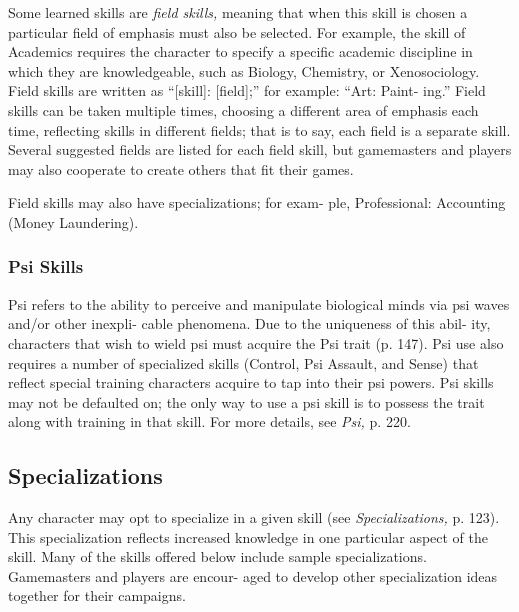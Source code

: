 Some learned skills are \textit{field skills,} meaning that when 
this skill is chosen a particular field of emphasis must 
also be selected. For example, the skill of Academics 
requires the character to specify a specific academic 
discipline in which they are knowledgeable, such as 
Biology, Chemistry, or Xenosociology. Field skills are 
written as ``[skill]: [field];'' for example: ``Art: Paint-
ing.'' Field skills can be taken multiple times, choosing 
a different area of emphasis each time, reflecting skills 
in different fields; that is to say, each field is a separate 
skill. Several suggested fields are listed for each field 
skill, but gamemasters and players may also cooperate 
to create others that fit their games.

Field skills may also have specializations; for exam-
ple, Professional: Accounting (Money Laundering).

\subsubsection{Psi Skills}

Psi refers to the ability to perceive and manipulate 
biological minds via psi waves and/or other inexpli-
cable phenomena. Due to the uniqueness of this abil-
ity, characters that wish to wield psi must acquire the 
Psi trait (p. 147). Psi use also requires a number of 
specialized skills (Control, Psi Assault, and Sense) that 
reflect special training characters acquire to tap into 
their psi powers. Psi skills may not be defaulted on; 
the only way to use a psi skill is to possess the trait 
along with training in that skill. For more details, see 
\textit{Psi,} p. 220.

\subsection{Specializations}

Any character may opt to specialize in a given skill 
(see \textit{Specializations,} p. 123). This specialization reflects 
increased knowledge in one particular aspect of the 
skill. Many of the skills offered below include sample 
specializations. Gamemasters and players are encour-
aged to develop other specialization ideas together for 
their campaigns.

